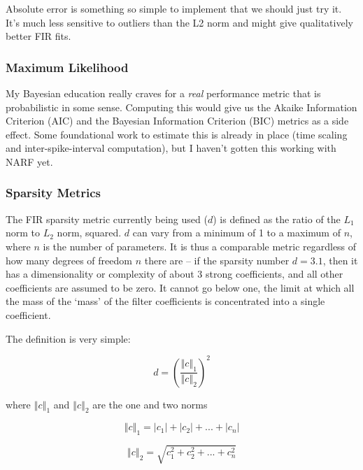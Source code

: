 \documentclass[11pt]{article}
\begin{document}
    
    Absolute error is something so simple to implement that we should just try it. It's much less sensitive to outliers than the L2 norm and might give qualitatively better FIR fits.

\subsubsection{Maximum Likelihood}
\label{sec-2.7.4}


    My Bayesian education really craves for a \emph{real} performance metric that is probabilistic in some sense. Computing this would give us the Akaike Information Criterion (AIC) and the Bayesian Information Criterion (BIC) metrics as a side effect. Some foundational work to estimate this is already in place (time scaling and inter-spike-interval computation), but I haven't gotten this working with NARF yet. 

\subsubsection{Sparsity Metrics}
\label{sec-2.7.5}


    The FIR sparsity metric currently being used ($d$) is defined as the ratio of the $L_1$ norm to $L_2$ norm, squared. $d$ can vary from a minimum of 1 to a maximum of $n$, where $n$ is the number of parameters. It is thus a comparable metric regardless of how many degrees of freedom $n$ there are -- if the sparsity number $d=3.1$, then it has a dimensionality or complexity of about 3 strong coefficients, and all other coefficients are assumed to be zero. It cannot go below one, the limit at which all the mass of the `mass' of the filter coefficients is concentrated into a single coefficient. 

  The definition is very simple:

  \begin{equation}
  d=\left(\frac{\left\Vert c\right\Vert _{1}}{\left\Vert c\right\Vert _{2}}\right)^{2}
  \end{equation}

  where $\left\Vert c\right\Vert _{1}$ and $\left\Vert c\right\Vert _{2}$ are the one and two norms

  \begin{equation}
  \left\Vert c\right\Vert _{1}=|c_{1}|+|c_{2}|+...+|c_{n}|
  \end{equation}

  \begin{equation}
  \left\Vert c\right\Vert _{2}=\sqrt{c_{1}^{2}+c_{2}^{2}+...+c_{n}^{2}}
  \end{equation}
 
\end{document}
